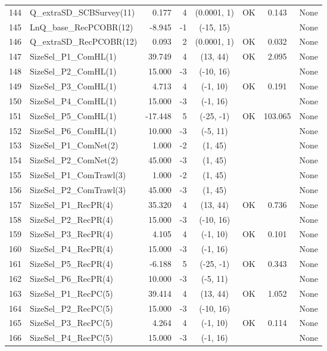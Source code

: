 \documentclass[12pt,]{article}
\begin{document}
\begin{landscape}
\begin{longtable}{rlrrcccl}
  144 & Q\_extraSD\_SCBSurvey(11) & 0.177 & 4 & (0.0001, 1) & OK & 0.143 & None \\ 
  145 & LnQ\_base\_RecPCOBR(12) & -8.945 & -1 & (-15, 15) &  &  & None \\ 
  146 & Q\_extraSD\_RecPCOBR(12) & 0.093 & 2 & (0.0001, 1) & OK & 0.032 & None \\ 
  147 & SizeSel\_P1\_ComHL(1) & 39.749 & 4 & (13, 44) & OK & 2.095 & None \\ 
  148 & SizeSel\_P2\_ComHL(1) & 15.000 & -3 & (-10, 16) &  &  & None \\ 
  149 & SizeSel\_P3\_ComHL(1) & 4.713 & 4 & (-1, 10) & OK & 0.191 & None \\ 
  150 & SizeSel\_P4\_ComHL(1) & 15.000 & -3 & (-1, 16) &  &  & None \\ 
  151 & SizeSel\_P5\_ComHL(1) & -17.448 & 5 & (-25, -1) & OK & 103.065 & None \\ 
  152 & SizeSel\_P6\_ComHL(1) & 10.000 & -3 & (-5, 11) &  &  & None \\ 
  153 & SizeSel\_P1\_ComNet(2) & 1.000 & -2 & (1, 45) &  &  & None \\ 
  154 & SizeSel\_P2\_ComNet(2) & 45.000 & -3 & (1, 45) &  &  & None \\ 
  155 & SizeSel\_P1\_ComTrawl(3) & 1.000 & -2 & (1, 45) &  &  & None \\ 
  156 & SizeSel\_P2\_ComTrawl(3) & 45.000 & -3 & (1, 45) &  &  & None \\ 
  157 & SizeSel\_P1\_RecPR(4) & 35.320 & 4 & (13, 44) & OK & 0.736 & None \\ 
  158 & SizeSel\_P2\_RecPR(4) & 15.000 & -3 & (-10, 16) &  &  & None \\ 
  159 & SizeSel\_P3\_RecPR(4) & 4.105 & 4 & (-1, 10) & OK & 0.101 & None \\ 
  160 & SizeSel\_P4\_RecPR(4) & 15.000 & -3 & (-1, 16) &  &  & None \\ 
  161 & SizeSel\_P5\_RecPR(4) & -6.188 & 5 & (-25, -1) & OK & 0.343 & None \\ 
  162 & SizeSel\_P6\_RecPR(4) & 10.000 & -3 & (-5, 11) &  &  & None \\ 
  163 & SizeSel\_P1\_RecPC(5) & 39.414 & 4 & (13, 44) & OK & 1.052 & None \\ 
  164 & SizeSel\_P2\_RecPC(5) & 15.000 & -3 & (-10, 16) &  &  & None \\ 
  165 & SizeSel\_P3\_RecPC(5) & 4.264 & 4 & (-1, 10) & OK & 0.114 & None \\ 
  166 & SizeSel\_P4\_RecPC(5) & 15.000 & -3 & (-1, 16) &  &  & None \\ 

\end{longtable}
\end{landscape}
\end{document}
